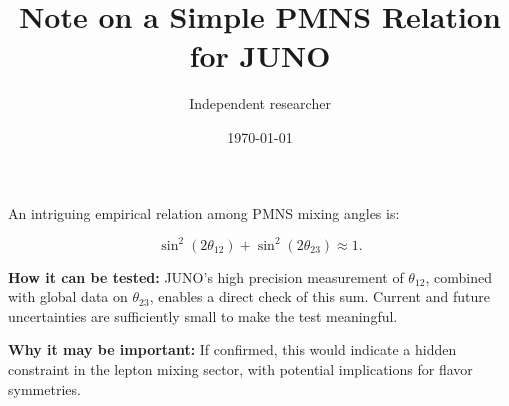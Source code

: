 \documentclass[12pt,a4paper]{article}
\title{Note on a Simple PMNS Relation for JUNO}
\author{Independent researcher}
\date{\today}
\begin{document}
\maketitle

\noindent
An intriguing empirical relation among PMNS mixing angles is:

\[
\sin^2(2\theta_{12}) + \sin^2(2\theta_{23}) \approx 1.
\]

\textbf{How it can be tested:}  
JUNO’s high precision measurement of $\theta_{12}$, combined with global data on $\theta_{23}$, enables a direct check of this sum. Current and future uncertainties are sufficiently small to make the test meaningful.

\textbf{Why it may be important:}  
If confirmed, this would indicate a hidden constraint in the lepton mixing sector, with potential implications for flavor symmetries.
\end{document}
